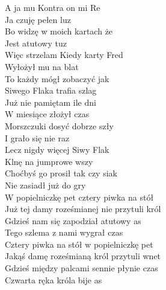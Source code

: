 A ja mu Kontra on mi Re \\
Ja czuję pełen luz \\
Bo widzę w moich kartach że \\
Jest atutowy tuz \\
Więc strzelam Kiedy karty Fred \\
Wyłożył mu na blat \\
To każdy mógł zobaczyć jak \\
Siwego Flaka trafia szlag \\

Już nie pamiętam ile dni \\
W miesiące złożył czas \\
Morszczuki dosyć dobrze szły \\
I grało się nie raz \\
Lecz nigdy więcej Siwy Flak \\
Klnę na jumprowe wszy \\
Choćbyś go prosił tak czy siak \\
Nie zasiadł już do gry \\

W popielniczkę pet cztery piwka na stół \\
Już tej damy roześmianej nie przytuli król \\
Gdzieś nam się zapodział atutowy as \\
Tego szlema z nami wygrał czas \\
Cztery piwka na stół w popielniczkę pet \\
Jakąś damę roześmianą król przytuli wnet \\
Gdzieś między palcami sennie płynie czas \\
Czwarta ręka króla bije as \\